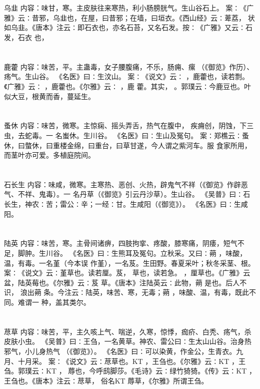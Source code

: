 \documentclass[12pt,UTF8]{ctexbook}
\begin{document}
\chapter{}乌韭
内容：味甘，寒。主皮肤往来寒热，利小肠膀胱气。生山谷石上。 
案∶《广雅》云∶昔邪，乌韭也，在屋，曰昔邪；在墙，曰垣衣。《西山经》云∶萆荔， 
状如乌韭。《唐本》注云∶即石衣也，亦名石苔，又名石发。按∶《广雅》又云∶石发，石衣 
也， 


\chapter{}鹿藿
内容：味苦，平。主蛊毒，女子腰腹痛，不乐，肠痈、瘰 （《御览》作历）、疡气。生山谷。 
《名医》曰∶生汶山。 
案∶《说文》云∶ ，鹿藿也，读若剽。《广雅》云∶ ，鹿藿也。《尔雅》云∶ ，鹿 
藿。其实， 。郭璞云∶今鹿豆也。叶似大豆，根黄而香，蔓延生。 


\chapter{}蚤休
内容：味苦，微寒。主惊痫、摇头弄舌，热气在腹中， 疾痈创，阴蚀，下三虫，去蛇毒。一 
名蚩休。生川谷。 
《名医》曰∶生山及冤句。 
案∶郑樵云∶蚤休，曰螫休，曰重楼金绵，曰重台，曰草甘遂，今人谓之紫河车。服 
食家所用，而茎叶亦可爱。多植庭院间。 


\chapter{}石长生
内容：味咸，微寒。主寒热、恶创、火热，辟鬼气不祥（《御览》作辟恶气、不祥、鬼毒）。一 
名丹草（《御览》引云丹沙草）。生山谷。 
《吴普》曰∶石长生，神农∶苦；雷公∶辛；一经∶甘。生咸阳（《御览》）。 
《名医》曰∶生咸阳。 


\chapter{}陆英
内容：味苦，寒。主骨间诸痹，四肢拘挛、疼酸，膝寒痛，阴痿，短气不足，脚肿。生川谷。 
《名医》曰∶生熊耳及冤句。立秋采。又曰∶蒴 ，味酸，温，有毒。一名堇（今本误 
作堇），一名芨。生田野。春夏采叶；秋冬采茎、根。 
案∶《说文》云∶堇草也。读若厘。芨， 草也，读若急。 ，厘草也。《广雅》云 
盆，陆英莓也。《尔雅》云∶芨 草。《唐本》注陆英云∶此物，蒴 是也。后人不识， 
浪出蒴 条。今注云∶陆英，味苦、寒，无毒；蒴 ，味酸、温，有毒，既此不同。难谓一 
种，盖其类尔。 


\chapter{}荩草
内容：味苦，平，主久咳上气、喘逆，久寒，惊悸，痂疥、白秃、疡气，杀皮肤小虫。 
《吴普》曰∶王刍，一名黄草。神农、雷公曰∶生太山山谷。治身热邪气，小儿身热气 
（《御览》）。 
《名医》曰∶可以染黄，作金公，生青衣。九月、十月采。 
案∶《说文》云∶荩草也。KT ，王刍也。《尔雅》云∶KT ，王刍。郭璞云∶KT ， 
蓐也，今呼鸱脚莎。《毛诗》云∶绿竹猗猗。《传》云∶KT ，王刍也。《唐本》注云∶荩草， 
俗名KT 蓐草，《尔雅》所谓王刍。 
\end{document}

